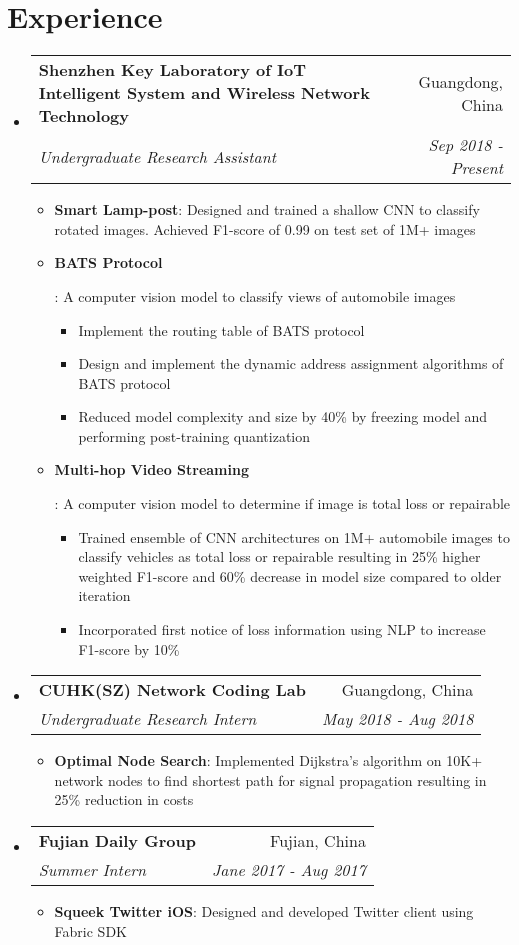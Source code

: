\documentclass[letterpaper,10pt]{article}
\makeatletter
\newcommand{\resumeItem}[2]{
	\item\small{
		\textbf{#1}{: #2 \vspace{-2pt}}
	}
}
\newcommand{\resumeSubheading}[4]{
	\vspace{-1pt}\item[]
	\begin{tabular*}{0.98\textwidth}{l@{\extracolsep{\fill}}r}
		\hspace{-10pt}\textbf{#1} & #2 \\
		\hspace{-10pt}\textit{\small#3} & \textit{\small #4} \\
	\end{tabular*}\vspace{-5pt}
}
\newcommand{\resumeSubHeadingListStart}{\begin{itemize}[leftmargin=*]}
\newcommand{\resumeSubHeadingListEnd}{\end{itemize}}
\newcommand{\resumeItemListStart}{\begin{itemize}}
\newcommand{\resumeItemListEnd}{\end{itemize}\vspace{-5pt}}
\newcommand{\shorterSection}[1]{\vspace{-10pt}\section{#1}}
\makeatother
\begin{document}
	\shorterSection{Experience}
	\resumeSubHeadingListStart
	
	\resumeSubheading
	{Shenzhen Key Laboratory of IoT Intelligent System and Wireless Network Technology}{Guangdong, China}
	{Undergraduate Research Assistant}{Sep 2018 - Present}
	\resumeItemListStart
	\resumeItem{Smart Lamp-post}
	{Designed and trained a shallow CNN to classify rotated images. Achieved F1-score of 0.99 on test set of 1M+ images}
	\resumeItem{BATS Protocol}
	{A computer vision model to classify views of automobile images
		\begin{itemize}
			\item Implement the routing table of BATS protocol
			\item Design and implement the dynamic address assignment algorithms of BATS protocol
			\item Reduced model complexity and size by 40\% by freezing model and performing post-training quantization
		\end{itemize}
	}
	\resumeItem{Multi-hop Video Streaming}
	{A computer vision model to determine if image is total loss or repairable
		\begin{itemize}
			\item Trained ensemble of CNN architectures on 1M+ automobile images to classify vehicles as total loss or repairable resulting in 25\% higher weighted F1-score and 60\% decrease in model size compared to older iteration
			\item Incorporated first notice of loss information using NLP to increase  F1-score by 10\%
		\end{itemize}
	}
	\resumeItemListEnd
	
	\resumeSubheading
	{CUHK(SZ) Network Coding Lab}{Guangdong, China}
	{Undergraduate Research Intern}{May 2018 - Aug 2018}
	\resumeItemListStart
	\resumeItem{Optimal Node Search}
	{Implemented Dijkstra's algorithm on 10K+ network nodes to find shortest path for signal propagation resulting in 25\% reduction in costs}
	\resumeItemListEnd
	
	\resumeSubheading
	{Fujian Daily Group}{Fujian, China}
	{Summer Intern}{Jane 2017 - Aug 2017}
	\resumeItemListStart
	\resumeItem{Squeek Twitter iOS}
	{Designed and developed Twitter client using Fabric SDK}
	\resumeItemListEnd
	
	\resumeSubHeadingListEnd
	
\end{document}

